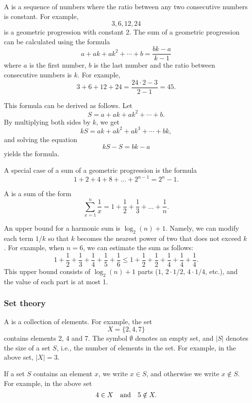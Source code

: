 A  is a sequence
of numbers
where the ratio between any two consecutive
numbers is constant.
For example,
\[3,6,12,24\]
is a geometric progression with constant 2.
The sum of a geometric progression can be calculated
using the formula
\[a + ak + ak^2 + \cdots + b = \frac{bk-a}{k-1}\]
where $a$ is the first number,
$b$ is the last number and the
ratio between consecutive numbers is $k$.
For example,
\[3+6+12+24=\frac{24 \cdot 2 - 3}{2-1} = 45.\]

This formula can be derived as follows. Let
\[ S = a + ak + ak^2 + \cdots + b .\]
By multiplying both sides by $k$, we get
\[ kS = ak + ak^2 + ak^3 + \cdots + bk,\]
and solving the equation
\[ kS-S = bk-a\]
yields the formula.

A special case of a sum of a geometric progression is the formula
\[1+2+4+8+\ldots+2^{n-1}=2^n-1.\]


A  is a sum of the form
\[ \sum_{x=1}^n \frac{1}{x} = 1+\frac{1}{2}+\frac{1}{3}+\ldots+\frac{1}{n}.\]

An upper bound for a harmonic sum is $\log_2(n)+1$.
Namely, we can
modify each term $1/k$ so that $k$ becomes
the nearest power of two that does not exceed $k$.
For example, when $n=6$, we can estimate
the sum as follows:
\[ 1+\frac{1}{2}+\frac{1}{3}+\frac{1}{4}+\frac{1}{5}+\frac{1}{6} \le
1+\frac{1}{2}+\frac{1}{2}+\frac{1}{4}+\frac{1}{4}+\frac{1}{4}.\]
This upper bound consists of $\log_2(n)+1$ parts
($1$, $2 \cdot 1/2$, $4 \cdot 1/4$, etc.),
and the value of each part is at most 1.

\subsubsection{Set theory}


A  is a collection of elements.
For example, the set
\[X=\{2,4,7\}\]
contains elements 2, 4 and 7.
The symbol $\emptyset$ denotes an empty set,
and $|S|$ denotes the size of a set $S$,
i.e., the number of elements in the set.
For example, in the above set, $|X|=3$.

If a set $S$ contains an element $x$,
we write $x \in S$,
and otherwise we write $x \notin S$.
For example, in the above set
\[4 \in X \hspace{10px}\textrm{and}\hspace{10px} 5 \notin X.\]


